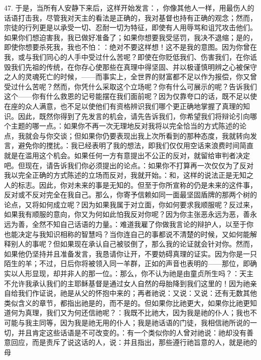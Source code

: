47. 于是，当所有人安静下来后，这样开始发言：，你像其他人一样，用最伤人的话语打击我，尽管我对天主的看法是正确的，我对基督也持有正确的观念；然而，宗徒的行列更是以承受一切、忍耐一切为特征，即使有人用辱骂和诅咒攻击他们。如果你们想迫害我，我已做好准备了；如果你想要我受惩罚，我决不退缩；是的，即使你想要杀死我，我也不怕：：绝对不要这样想！这不是我的意图。因为你曾在我，或与我们同心的人手中受过什么苦呢？即使在你贬低我们、伤害我们，在你诋毁我们先祖的传统，在你存心使那些在真理中得坚固、并以极谨慎明辨之心被保守之人的灵魂死亡的时候，——而事实上，全世界的财富都不足以作为报偿，你又曾受过什么苦呢？然而，你凭什么采取这个立场呢？你有什么可展示的呢？告诉我们这个——你有什么救恩的记号能摆在我们面前呢？因为仅靠夸口的话，既不足以使在座的众人满意，也不足以使他们有资格辨识我们哪个更正确地掌握了真理的知识。因此，既然你得到了先发言的机会，请先告诉我们，你希望我们将辩论引向哪个主题的哪一点。：如果你不再一次无理地反对我将以完全恰当的方式陈述的论点，我就会与你交谈；但如果你仍要表现出我上次所看到的那种态度，我就转向发言，避免你的搅扰。：我已经表明了我的想法，即我们仅仅用空话来浪费时间简直就是在滥用这个机会。如果任何一方有意提出不公正的反对，就留给审判者决定吧。但现在，请告诉我们你必须提出的论点。：如果你不打算再一次仅仅为了反对我以完全正确的方式陈述的立场而反对，我就开始。：和，这样的说法正是无知之人的标志。因此，你对未来的事是无知的。但至于你所宣称的仍是未来的这件事，反对或不反对完全在我自己。那么，你寄予信赖如同一面最坚固盾牌的那两个树的论点，又将如何成立呢？因为如果我属于对立面，你如何要求我顺服呢？反过来，如果我有顺服的意向，你又为何如此怕我反对你呢？因为你主张恶永远为恶，善永远为善，全然不知自己话语的力量。：难道我雇了你做我言论的辩护人，以至于你也能决定与我知识相称的智慧吗？当你连自己的事都说不清楚的时候，又如何能解释别人的事呢？但如果现在承认自己被驳倒了，那么我的论证就会针对你。然而，如果他仍坚持并且准备发言，我恳请你让开，不要妨碍真理的证实。因为你是一只陌生的羊；不过，日后你将被领入同一羊群，正如的声音也表明的——那位，即确实以人形显现，却并非人的那一位。：那么，你不认为祂是由童贞所生吗？：天主不允许我承认我们的主耶稣基督是通过女人自然的母胎降到我们这里的！因为祂亲自给我们作证说，祂是从父的怀抱中来的；再者祂说：又说：又说：还有无数其他类似含义的章节，都指出祂是的，而不是的。但如果你比祂更大，如果你比祂更知道何为真理，我们又为何还信祂呢？：我既不比祂大，因为我是祂的仆人；我也不可能与我主同等，因为我是祂无用的仆人；我是祂话语的门徒，我相信祂所说的一切，并且肯定这些话语是不可改变的。：有一个类似你的人曾对祂说：祂却没有善意回应，而是责斥了说这话的人，说：并且指出，那些遵行祂旨意的人，就是祂的母